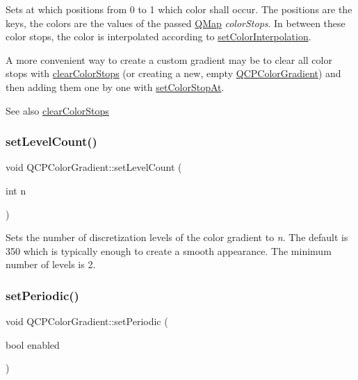 Sets at which positions from 0 to 1 which color shall occur. The positions are the keys, the colors are the values of the passed \hyperlink{class_q_map}{Q\+Map} {\itshape color\+Stops}. In between these color stops, the color is interpolated according to \hyperlink{class_q_c_p_color_gradient_aa13fda86406e1d896a465a409ae63b38}{set\+Color\+Interpolation}.

A more convenient way to create a custom gradient may be to clear all color stops with \hyperlink{class_q_c_p_color_gradient_a939213e85f0d1279519d555c5fcfb6ad}{clear\+Color\+Stops} (or creating a new, empty \hyperlink{class_q_c_p_color_gradient}{Q\+C\+P\+Color\+Gradient}) and then adding them one by one with \hyperlink{class_q_c_p_color_gradient_a3b48be5e78079db1bb2a1188a4c3390e}{set\+Color\+Stop\+At}.

\begin{DoxySeeAlso}{See also}
\hyperlink{class_q_c_p_color_gradient_a939213e85f0d1279519d555c5fcfb6ad}{clear\+Color\+Stops} 
\end{DoxySeeAlso}
\mbox{\label{class_q_c_p_color_gradient_a18da587eb4f7fc788ea28ba15b6a12de}} 
\subsubsection{\texorpdfstring{set\+Level\+Count()}{setLevelCount()}}
{\footnotesize\ttfamily void Q\+C\+P\+Color\+Gradient\+::set\+Level\+Count (\begin{DoxyParamCaption}\item[{int}]{n }\end{DoxyParamCaption})}

Sets the number of discretization levels of the color gradient to {\itshape n}. The default is 350 which is typically enough to create a smooth appearance. The minimum number of levels is 2.

 \mbox{\label{class_q_c_p_color_gradient_a39d6448155fc00a219f239220d14bb39}} 
\subsubsection{\texorpdfstring{set\+Periodic()}{setPeriodic()}}
{\footnotesize\ttfamily void Q\+C\+P\+Color\+Gradient\+::set\+Periodic (\begin{DoxyParamCaption}\item[{bool}]{enabled }\end{DoxyParamCaption})}

